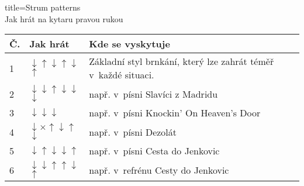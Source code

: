 \begin{song}{title=\centering Strum patterns \\\normalsize Jak hrát na kytaru pravou rukou \vspace*{-0.3cm}}  %

\newcommand{\up}{$\uparrow$} %
\newcommand{\dn}{$\downarrow$} %
\newcommand{\x}{$\times$} %
\newcommand{\tu}{\textunderscore} %
\centering
\mezera 

\renewcommand{\arraystretch}{1.4}
\begin{tabular}{l  l  l}
\hline\hline 
Č. & Jak hrát & Kde se vyskytuje  \\ \hline
1  & \dn \up \dn \up \dn \up & Základní styl brnkání, který lze zahrát téměř v~každé situaci.   \\
2  & \dn \tu \dn \up \tu  \dn \tu \dn \tu \dn & např. v~písni Slavíci z Madridu  \\
3  & \dn \tu \tu \tu \dn \tu \dn & např. v~písni Knockin' On Heaven's Door  \\
4  & \dn \x  \up \dn \up \dn & např. v~písni Dezolát \\
5  & \dn \up \dn \tu \dn \up & např. v~písni Cesta do Jenkovic \\
6  & \dn \tu \dn \up \tu \up \dn \up & např. v~refrénu Cesty do Jenkovic \\
\hline \hline
\end{tabular}



	
\setcounter{Slokočet}{0}
\end{song}


